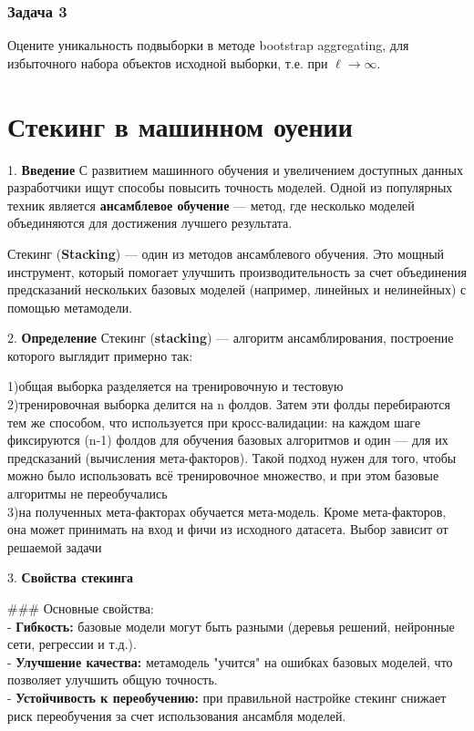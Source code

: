 \subsubsection*{Задача 3}
Оцените уникальность подвыборки в методе bootstrap aggregating, для избыточного набора объектов исходной выборки, т.е. при $\ell \to \infty$.


\section{Стекинг в машинном оуении}


1. \textbf{Введение}  
С развитием машинного обучения и увеличением доступных данных разработчики ищут способы повысить точность моделей. Одной из популярных техник является \textbf{ансамблевое обучение} — метод, где несколько моделей объединяются для достижения лучшего результата.  

Стекинг (\textbf{Stacking}) — один из методов ансамблевого обучения. Это мощный инструмент, который помогает улучшить производительность за счет объединения предсказаний нескольких базовых моделей (например, линейных и нелинейных) с помощью метамодели.  

2. \textbf{Определение}  
Стекинг (\textbf{stacking}) — алгоритм ансамблирования, построение которого выглядит примерно так:

1)общая выборка разделяется на тренировочную и тестовую\\
2)тренировочная выборка делится на n фолдов. Затем эти фолды перебираются тем же способом, что используется при кросс-валидации: на каждом шаге фиксируются (n-1)  фолдов для обучения базовых алгоритмов и один — для их предсказаний (вычисления мета-факторов). Такой подход нужен для того, чтобы можно было использовать всё тренировочное множество, и при этом базовые алгоритмы не переобучались\\
3)на полученных мета-факторах обучается мета-модель. Кроме мета-факторов, она может принимать на вход и фичи из исходного датасета. Выбор зависит от решаемой задачи


3. \textbf{Свойства стекинга} 

### Основные свойства:  \\
- \textbf{Гибкость:} базовые модели могут быть разными (деревья решений, нейронные сети, регрессии и т.д.). \\ 
- \textbf{Улучшение качества:} метамодель "учится" на ошибках базовых моделей, что позволяет улучшить общую точность.  \\
- \textbf{Устойчивость к переобучению:} при правильной настройке стекинг снижает риск переобучения за счет использования ансамбля моделей.  \\


